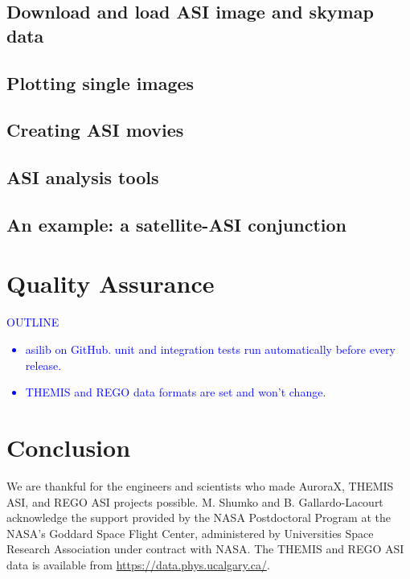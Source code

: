 \documentclass[draft]{agujournal2019}
\begin{document}
\subsection{Download and load ASI image and skymap data}

\subsection{Plotting single images}

\subsection{Creating ASI movies}

\subsection{ASI analysis tools}

\subsection{An example: a satellite-ASI conjunction}

\section{Quality Assurance}
\textcolor{blue}{
      OUTLINE
      \begin{itemize}
            \item asilib on GitHub. unit and integration tests run automatically before every release.
            \item THEMIS and REGO data formats are set and won't change.
      \end{itemize}
}

\section{Conclusion}

\acknowledgments
We are thankful for the engineers and scientists who made AuroraX, THEMIS ASI, and REGO ASI projects possible. M. Shumko and B. Gallardo-Lacourt acknowledge the support provided by the NASA Postdoctoral Program at the NASA’s Goddard Space Flight Center, administered by Universities Space Research Association under contract with NASA. The THEMIS and REGO ASI data is available from \url{https://data.phys.ucalgary.ca/}.

% 
\end{document}
